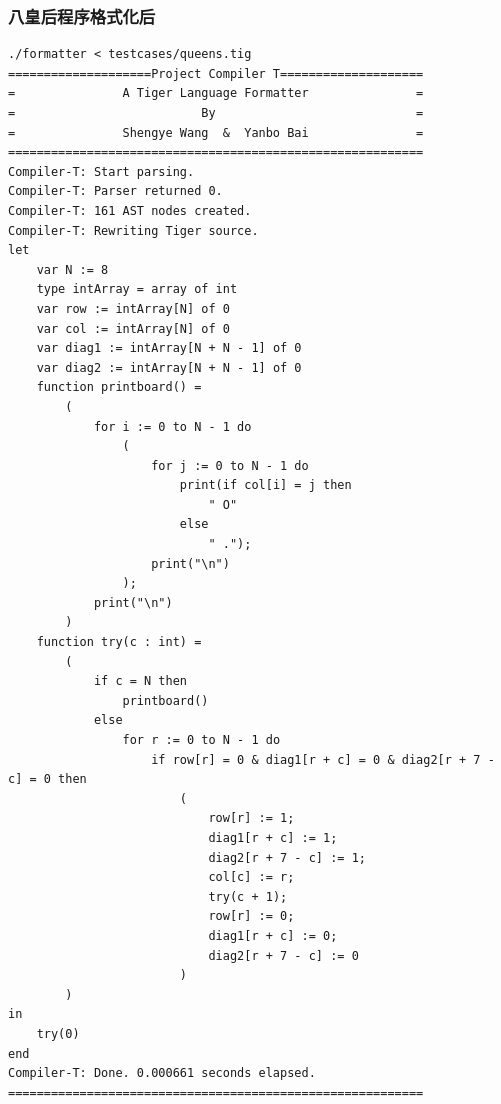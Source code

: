 \subsubsection{八皇后程序格式化后}
\begin{verbatim}
./formatter < testcases/queens.tig 
====================Project Compiler T====================
=               A Tiger Language Formatter               =
=                          By                            =
=               Shengye Wang  &  Yanbo Bai               =
==========================================================
Compiler-T: Start parsing.
Compiler-T: Parser returned 0.
Compiler-T: 161 AST nodes created.
Compiler-T: Rewriting Tiger source.
let
    var N := 8
    type intArray = array of int
    var row := intArray[N] of 0
    var col := intArray[N] of 0
    var diag1 := intArray[N + N - 1] of 0
    var diag2 := intArray[N + N - 1] of 0
    function printboard() = 
        (
            for i := 0 to N - 1 do
                (
                    for j := 0 to N - 1 do
                        print(if col[i] = j then
                            " O"
                        else
                            " .");
                    print("\n")
                );
            print("\n")
        )
    function try(c : int) = 
        (
            if c = N then
                printboard()
            else
                for r := 0 to N - 1 do
                    if row[r] = 0 & diag1[r + c] = 0 & diag2[r + 7 - c] = 0 then
                        (
                            row[r] := 1;
                            diag1[r + c] := 1;
                            diag2[r + 7 - c] := 1;
                            col[c] := r;
                            try(c + 1);
                            row[r] := 0;
                            diag1[r + c] := 0;
                            diag2[r + 7 - c] := 0
                        )
        )
in
    try(0)
end
Compiler-T: Done. 0.000661 seconds elapsed.
==========================================================
\end{verbatim}

